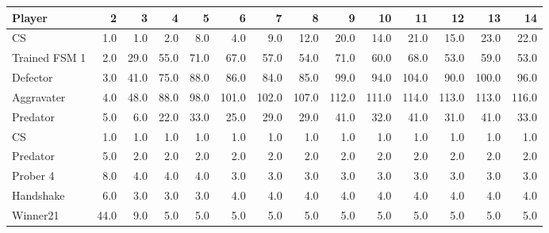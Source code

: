 \begin{tabular}{lrrrrrrrrrrrrr}
\toprule
        Player &     2 &     3 &     4 &     5 &      6 &      7 &      8 &      9 &     10 &     11 &     12 &     13 &     14 \\
\midrule
            CS &   1.0 &   1.0 &   2.0 &   8.0 &    4.0 &    9.0 &   12.0 &   20.0 &   14.0 &   21.0 &   15.0 &   23.0 &   22.0 \\
 Trained FSM 1 &   2.0 &  29.0 &  55.0 &  71.0 &   67.0 &   57.0 &   54.0 &   71.0 &   60.0 &   68.0 &   53.0 &   59.0 &   53.0 \\
      Defector &   3.0 &  41.0 &  75.0 &  88.0 &   86.0 &   84.0 &   85.0 &   99.0 &   94.0 &  104.0 &   90.0 &  100.0 &   96.0 \\
    Aggravater &   4.0 &  48.0 &  88.0 &  98.0 &  101.0 &  102.0 &  107.0 &  112.0 &  111.0 &  114.0 &  113.0 &  113.0 &  116.0 \\
      Predator &   5.0 &   6.0 &  22.0 &  33.0 &   25.0 &   29.0 &   29.0 &   41.0 &   32.0 &   41.0 &   31.0 &   41.0 &   33.0 \\
            CS &   1.0 &   1.0 &   1.0 &   1.0 &    1.0 &    1.0 &    1.0 &    1.0 &    1.0 &    1.0 &    1.0 &    1.0 &    1.0 \\
      Predator &   5.0 &   2.0 &   2.0 &   2.0 &    2.0 &    2.0 &    2.0 &    2.0 &    2.0 &    2.0 &    2.0 &    2.0 &    2.0 \\
      Prober 4 &   8.0 &   4.0 &   4.0 &   4.0 &    3.0 &    3.0 &    3.0 &    3.0 &    3.0 &    3.0 &    3.0 &    3.0 &    3.0 \\
     Handshake &   6.0 &   3.0 &   3.0 &   3.0 &    4.0 &    4.0 &    4.0 &    4.0 &    4.0 &    4.0 &    4.0 &    4.0 &    4.0 \\
      Winner21 &  44.0 &   9.0 &   5.0 &   5.0 &    5.0 &    5.0 &    5.0 &    5.0 &    5.0 &    5.0 &    5.0 &    5.0 &    5.0 \\
\bottomrule
\end{tabular}
